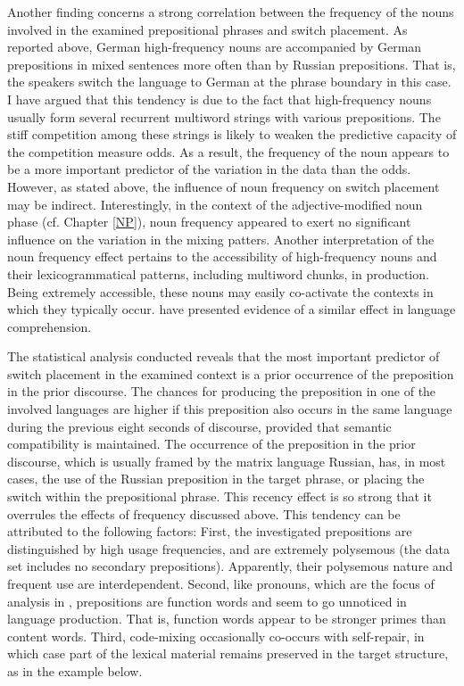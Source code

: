 Another finding concerns a strong correlation between the frequency of the nouns involved in the examined prepositional phrases and switch placement. As reported above, German high-frequency nouns are accompanied by German prepositions in mixed sentences more often than by Russian prepositions. That is, the speakers switch the language to German at the phrase boundary in this case. I have argued that this tendency is due to the fact that high-frequency nouns usually form several recurrent multiword strings with various prepositions. The stiff competition among these strings is likely to weaken the predictive capacity of the competition measure odds. As a result, the frequency of the noun appears to be a more important predictor of the variation in the data than the odds. However, as stated above, the influence of noun frequency on switch placement may be indirect. Interestingly, in the context of the adjective-modified noun phase (cf. Chapter \ref{NP}), noun frequency appeared to exert no significant influence on the variation in the mixing patters. Another interpretation of the noun frequency effect pertains to the accessibility of high-frequency nouns and their lexicogrammatical patterns, including multiword chunks, in production. Being extremely accessible, these nouns may easily co-activate the contexts in which they typically occur. \citet{arnon-snider} have presented evidence of a similar effect in language comprehension. 

The statistical analysis conducted reveals that the most important predictor of switch placement in the examined context is a prior occurrence of the preposition in the prior discourse. The chances for producing the preposition in one of the involved languages are higher if this preposition also occurs in the same language during the previous eight seconds of discourse, provided that semantic compatibility is maintained. The occurrence of the preposition in the prior discourse, which is usually framed by the matrix language Russian, has, in most cases, the use of the Russian preposition in the target phrase, or placing the switch within the prepositional phrase. This recency effect is so strong that it overrules the effects of frequency discussed above. This tendency can be attributed to the following factors: First, the investigated prepositions are distinguished by high usage frequencies, and are extremely polysemous (the data set includes no secondary prepositions). Apparently, their polysemous nature and frequent use are interdependent. Second, like pronouns, which are the focus of analysis in \citep{torres-travis}, prepositions are function words and seem to go unnoticed in language production. That is, function words appear to be stronger primes than content words. Third, code-mixing occasionally co-occurs with self-repair, in which case part of the lexical material remains preserved in the target structure, as in the example below.

